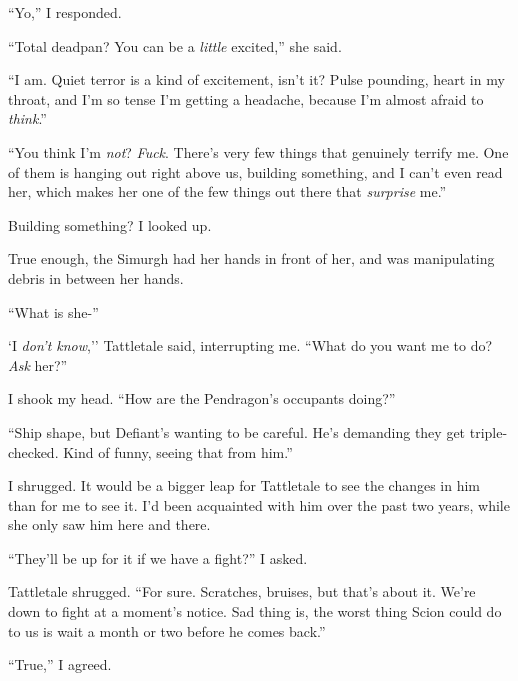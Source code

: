 ``Yo,'' I responded.



``Total deadpan?  You can be a \emph{little} excited,'' she said.



``I am.  Quiet terror is a kind of excitement, isn't it?  Pulse pounding, heart in my throat, and I'm so tense I'm getting a headache, because I'm almost afraid to \emph{think}.''



``You think I'm \emph{not}?  \emph{Fuck}.  There's very few things that genuinely terrify me.  One of them is hanging out right above us, building something, and I can't even read her, which makes her one of the few things out there that \emph{surprise }me.''



Building something?  I looked up.



True enough, the Simurgh had her hands in front of her, and was manipulating debris in between her hands.



``What is she-''



`I \emph{don't know},'' Tattletale said, interrupting me.  ``What do you want me to do?  \emph{Ask} her?''



I shook my head.  ``How are the Pendragon's occupants doing?''



``Ship shape, but Defiant's wanting to be careful.  He's demanding they get triple-checked.  Kind of funny, seeing that from him.''



I shrugged.  It would be a bigger leap for Tattletale to see the changes in him than for me to see it.  I'd been acquainted with him over the past two years, while she only saw him here and there.



``They'll be up for it if we have a fight?'' I asked.



Tattletale shrugged.  ``For sure.  Scratches, bruises, but that's about it.  We're down to fight at a moment's notice.  Sad thing is, the worst thing Scion could do to us is wait a month or two before he comes back.''



``True,'' I agreed.



